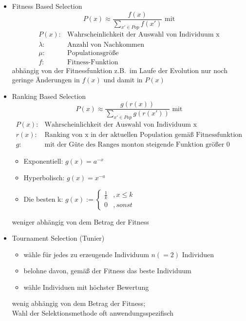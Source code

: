 \begin{itemize}
	\item Fitness Based Selection
	\begin{equation*}
		P(x) \approx \frac{f(x)}{\sum_{x' \in Pop} f(x')} \text{ mit}
	\end{equation*}
	\begin{align*}
		P(x): & \text{Wahrscheinlichkeit der Auswahl von Individuum x} \\
		\lambda: & \text{Anzahl von Nachkommen} \\
		\mu: & \text{Populationsgröße} \\
		f: & \text{Fitness-Funktion}
	\end{align*}
	abhängig von der Fitnessfunktion z.B.\ im Laufe der Evolution nur noch geringe Änderungen in $f(x)$ und damit in $P(x)$
	\item Ranking Based Selection
	\begin{equation*}
		P(x) \approx \frac{g(r(x))}{\sum_{x' \in Pop} g(r(x'))} \text{ mit}
	\end{equation*}
	\begin{align*}
		P(x): & \text{Wahrscheinlichkeit der Auswahl von Individuum x} \\
		r(x): & \text{Ranking von x in der aktuellen Population gemäß Fitnessfunktion} \\
		g: & \text{mit der Güte des Ranges monton steigende Funktion größer 0}
	\end{align*}
	\begin{itemize}
		\item Exponentiell: $g(x) = a^{-x}$
		\item Hyperbolisch: $g(x) = x^{-a}$
		\item Die besten k: $g(x) := 
		\begin{cases}
			\frac{1}{k} &, x \leq k \\
			0 &, sonst
		\end{cases}$
	\end{itemize}
	weniger abhängig von dem Betrag der Fitness
	\item Tournament Selection (Tunier)
	\begin{itemize}
		\item wähle für jedes zu erzeugende Individuum $n (=2)$ Individuen
		\item belohne davon, gemäß der Fitness das beste Individuum
		\item wähle Individuen mit höchster Bewertung
	\end{itemize}
	wenig abhängig von dem Betrag der Fitness; \\Wahl der Selektionsmethode oft anwendungsspezifisch
\end{itemize}
